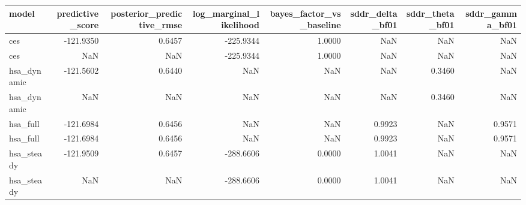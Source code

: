 \begin{tabular}{lrrrrrrr}
\toprule
model & predictive\_score & posterior\_predictive\_rmse & log\_marginal\_likelihood & bayes\_factor\_vs\_baseline & sddr\_delta\_bf01 & sddr\_theta\_bf01 & sddr\_gamma\_bf01 \\
\midrule
ces & -121.9350 & 0.6457 & -225.9344 & 1.0000 & NaN & NaN & NaN \\
ces & NaN & NaN & -225.9344 & 1.0000 & NaN & NaN & NaN \\
hsa\_dynamic & -121.5602 & 0.6440 & NaN & NaN & NaN & 0.3460 & NaN \\
hsa\_dynamic & NaN & NaN & NaN & NaN & NaN & 0.3460 & NaN \\
hsa\_full & -121.6984 & 0.6456 & NaN & NaN & 0.9923 & NaN & 0.9571 \\
hsa\_full & -121.6984 & 0.6456 & NaN & NaN & 0.9923 & NaN & 0.9571 \\
hsa\_steady & -121.9509 & 0.6457 & -288.6606 & 0.0000 & 1.0041 & NaN & NaN \\
hsa\_steady & NaN & NaN & -288.6606 & 0.0000 & 1.0041 & NaN & NaN \\
\bottomrule
\end{tabular}
